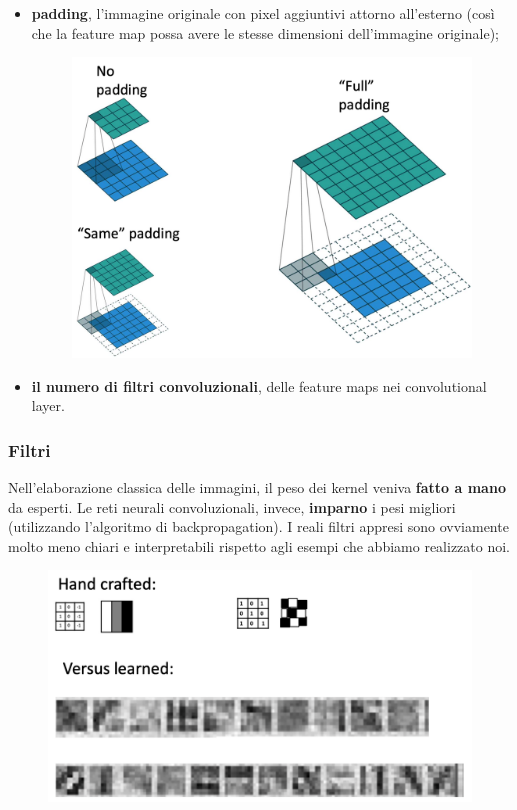 \begin{itemize}
\begin{figure}[!h]
            \centering
        \end{figure}
    \item \textbf{padding}, l'immagine originale con pixel aggiuntivi attorno all'esterno (così che la feature map possa avere le stesse dimensioni dell'immagine originale);
        \begin{figure}[!h]
            \includegraphics[scale=.25]{images/cnn/padding.png}
            \centering
        \end{figure}
    \item \textbf{il numero di filtri convoluzionali}, delle feature maps nei convolutional layer.
\end{itemize}
\newpage
\subsubsection{Filtri}
Nell'elaborazione classica delle immagini, il peso dei kernel veniva \textbf{fatto a mano} da esperti.
Le reti neurali convoluzionali, invece, \textbf{imparno} i pesi migliori (utilizzando l'algoritmo di backpropagation).
I reali filtri appresi sono ovviamente molto meno chiari e interpretabili rispetto agli esempi che abbiamo realizzato noi. 
\begin{figure}[!h]
    \includegraphics[scale=.7]{images/cnn/filters.png}
    \centering
\end{figure}
\newpage

